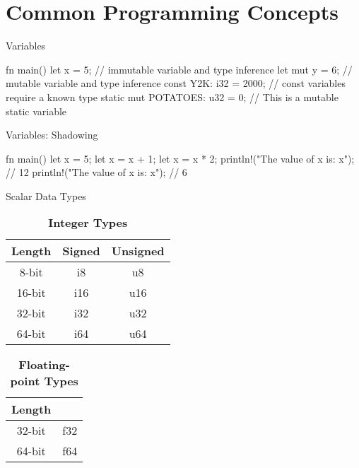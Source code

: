 \section{Common Programming Concepts}

\begin{frame}[fragile]{Variables}
    \begin{code}[basicstyle=\footnotesize]
    fn main() {
        let x = 5; // immutable variable and type inference
        let mut y = 6; // mutable variable and type inference
        const Y2K: i32 = 2000; // const variables require a known type
        static mut POTATOES: u32 = 0; // This is a mutable static variable
    }
    \end{code}
\end{frame}

\begin{frame}[fragile]{Variables: Shadowing}
    \centering
    \begin{code}[]
    fn main() {
        let x = 5;
        let x = x + 1;
        {
            let x = x * 2;
            println!("The value of x is: {x}"); // 12
        }
        println!("The value of x is: {x}"); // 6
    }
    \end{code}
\end{frame}

\begin{frame}{Scalar Data Types}
    \begin{table}[]
        \caption*{\textbf{Integer Types}}
        \begin{tabular}{|c|c|c|}
        \hline
        \rowcolor[HTML]{C0C0C0} 
        Length & Signed & Unsigned \\ \hline
        8-bit  & i8     & u8       \\ \hline
        16-bit & i16    & u16      \\ \hline
        32-bit & i32    & u32      \\ \hline
        64-bit & i64    & u64      \\ \hline
        \end{tabular}
    \end{table}

    \begin{table}[]
        \caption*{\textbf{Floating-point Types}}
        \begin{tabular}{|c|c|}
        \hline
        \rowcolor[HTML]{C0C0C0} 
        Length &        \\ \hline
        32-bit & f32    \\ \hline
        64-bit & f64    \\ \hline
        \end{tabular}
    \end{table}
\end{frame}

